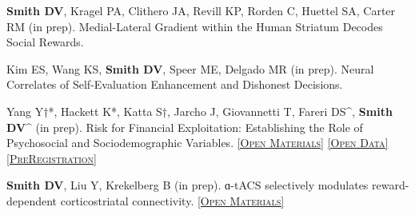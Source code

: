 \documentclass[11pt, letterpaper]{article}
\newcommand{\materials}[1]{\href{#1}{\scriptsize\textsc{[Open Materials]}}}
\newcommand{\data}[1]{\href{#1}{\scriptsize\textsc{[Open Data]}}}
\newcommand{\preregistration}[1]{\href{#1}{\scriptsize\textsc{[PreRegistration]}}}
\begin{document}
\begin{hangparas}{.5in}{1}

\textbf{Smith DV}, Kragel PA, Clithero JA, Revill KP, Rorden C, Huettel SA, Carter RM (in prep). Medial-Lateral Gradient within the Human Striatum Decodes Social Rewards.


Kim ES, Wang KS, \textbf{Smith DV}, Speer ME, Delgado MR (in prep). Neural Correlates of Self-Evaluation Enhancement and Dishonest Decisions.


Yang Y†*, Hackett K*, Katta S†, Jarcho J, Giovannetti T, Fareri DS\^{}, \textbf{Smith DV}\^{} (in prep). Risk for Financial Exploitation: Establishing the Role of Psychosocial and Sociodemographic Variables. \materials{https://osf.io/hd5nx/} \data{https://osf.io/hd5nx/} \preregistration{https://osf.io/hd5nx/}

\textbf{Smith DV}, Liu Y, Krekelberg B (in prep). ɑ-tACS selectively modulates reward-dependent corticostriatal connectivity. \materials{https://github.com/DVS-Lab/r21-cardgame}


\end{hangparas}


\vspace{.4cm}
\end{document}
